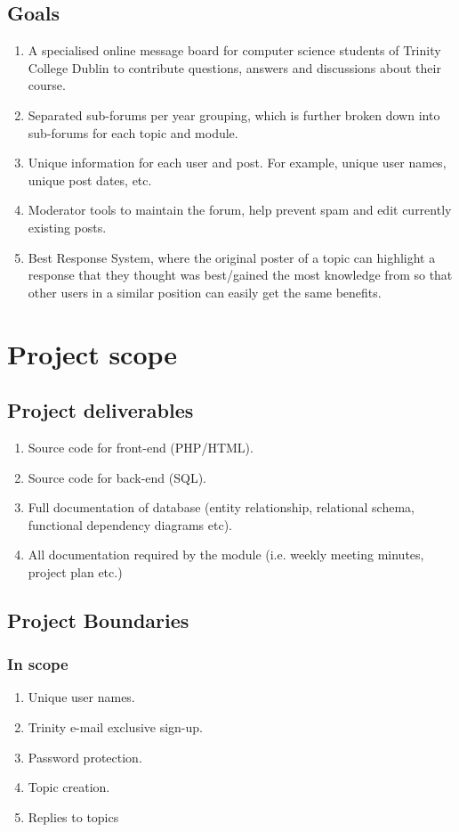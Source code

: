 \documentclass[a4paper, 12pt]{article}
\begin{document}
		\subsection{Goals}
			\begin{enumerate}[label*=\arabic*.]
				\item A specialised online message board for computer science students of Trinity College Dublin to contribute questions, answers and discussions about their course.
				\item Separated sub-forums per year grouping, which is further broken down into sub-forums for each topic and module.
				\item Unique information for each user and post. For example, unique user names, unique post dates, etc.
				\item Moderator tools to maintain the forum, help prevent spam and edit currently existing posts.
				\item Best Response System, where the original poster of a topic can highlight a response that they thought 
				was best/gained the most knowledge from so that other users in a similar position can easily get the same benefits.
			\end{enumerate}
	\newpage		
	\section{Project scope}
		\subsection{Project deliverables}
			\begin{enumerate}[label*=\arabic*.]
				\item Source code for front-end (PHP/HTML).
				\item Source code for back-end (SQL).
				\item Full documentation of database (entity relationship, relational schema, functional dependency diagrams etc).
				\item All documentation required by the module (i.e. weekly meeting minutes, project plan etc.)
			\end{enumerate}
		\subsection{Project Boundaries}
			\subsubsection{In scope}
				\begin{enumerate}[label*=\arabic*.]
					\item Unique user names.
					\item Trinity e-mail exclusive sign-up.
					\item Password protection.
					\item Topic creation.
					\item Replies to topics	
				\end{enumerate}
\end{document}
